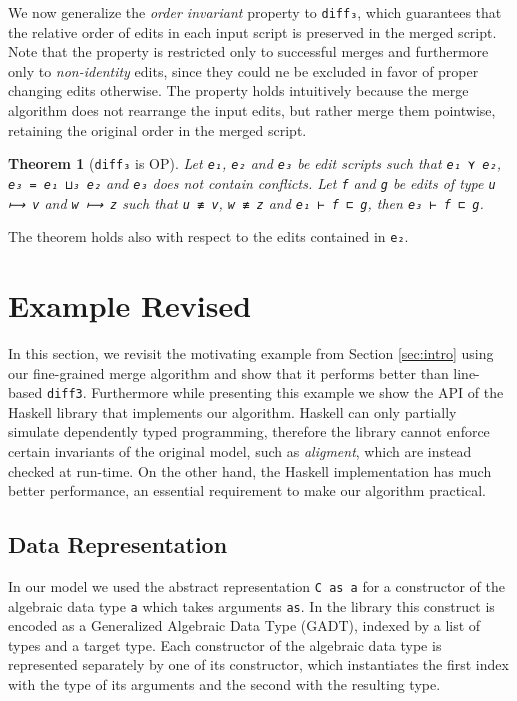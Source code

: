 \documentclass{sigplanconf}
\theoremstyle{plain}
\newtheorem{thm}{Theorem}
\begin{document}
We now generalize the \emph{order invariant} property to
\texttt{diff₃}, which guarantees that the relative order of edits in
each input script is preserved in the merged script.
%
Note that the property is restricted only to successful merges and
furthermore only to \emph{non-identity} edits, since they could 
ne be excluded in favor of proper changing edits otherwise.
%
The property holds intuitively because the merge algorithm does not
rearrange the input edits, but rather merge them pointwise, retaining
the original order in the merged script.
%
\begin{thm}[\texttt{diff₃} is OP]
  Let \texttt{e₁}, \texttt{e₂} and \texttt{e₃} be edit scripts such
  that \texttt{e₁ ⋎ e₂}, \texttt{e₃ = e₁ ⊔₃ e₂} and \texttt{e₃} does not
  contain conflicts.
%
  Let \texttt{f} and \texttt{g} be edits of type \texttt{u ⟼ v} and
  \texttt{w ⟼ z} such that \texttt{u ≢ v}, \texttt{w ≢ z} and
  \texttt{e₁ ⊢ f ⊏ g}, then \texttt{e₃ ⊢ f ⊏ g}.
\end{thm}
  The theorem holds also with respect to the edits contained in \texttt{e₂}.

\section{Example Revised}
\label{sec:haskell}
In this section, we revisit the motivating example from Section
\ref{sec:intro} using our fine-grained merge algorithm and show that
it performs better than line-based \texttt{diff3}.
%
Furthermore while presenting this example we show the API of the
Haskell library that implements our algorithm.
%
Haskell can only partially simulate dependently typed programming,
therefore the library cannot enforce certain invariants of the
original model, such as  \emph{aligment}, which are instead checked at
run-time.
%
On the other hand, the Haskell implementation has much better
performance, an essential requirement to make our algorithm practical.
%

\subsection{Data  Representation}
In our model we used the abstract representation \texttt{C as a}
for a constructor of the algebraic data type \texttt{a} which takes
arguments \texttt{as}.
%
In the library this construct is encoded as a Generalized Algebraic
Data Type (GADT), indexed by a list of types and a target type.
%
Each constructor of the algebraic data type is represented separately
by one of its constructor, which instantiates the first index with
the type of its arguments and the second with the resulting type.
%
\end{document}
